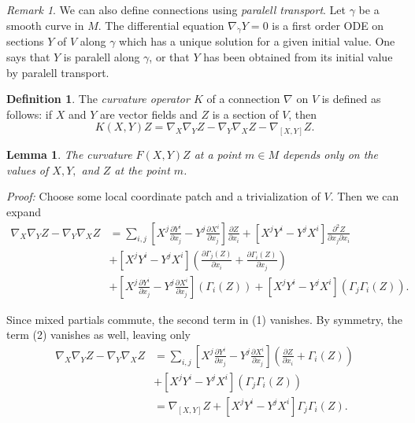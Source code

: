 \documentclass[12pt, reqno]{extarticle}
\theoremstyle{plain}
\newtheorem{lemma}{Lemma}[section]
\theoremstyle{definition}
\newtheorem{definition}{Definition}[section]
\theoremstyle{remark}
\newtheorem{remark}{Remark}[section]
\begin{document}
\begin{remark}
    We can also define connections using \textit{paralell transport}. Let $\gamma$ be a 
    smooth curve in $M$. The differential equation $\nabla_{\dot{\gamma}}Y = 0$ is a first 
    order ODE on sections $Y$ of $V$ along $\gamma$ which has a unique solution for a 
    given initial value. One says that $Y$ is paralell along $\gamma$, or that 
    $Y$ has been obtained from its initial value by paralell transport. 
\end{remark}

\begin{definition}
    The \textit{curvature operator $K$} of a connection $\nabla$ on $V$ is defined as follows: 
    if $X$ and $Y$ are vector fields and $Z$ is a section of $V$, then 
    \[
        K(X,Y)Z = \nabla_X\nabla_Y Z - \nabla_Y \nabla_X Z - \nabla_{[X,Y]}Z.
    \]
\end{definition}

\begin{lemma}
    The curvature $F(X,Y)Z$ at a point $m \in M$ depends only on the values of $X, Y,$ and $Z$ at the point 
    $m$.
\end{lemma}

\textit{Proof:} Choose some local coordinate patch and a trivialization of $V$. Then we can expand
\begin{align}
    \nabla_X \nabla_Y Z - \nabla_Y \nabla_X Z & = 
    \sum_{i,j} \left[X^j \frac{\partial Y^i}{\partial x_j} 
    - Y^j \frac{\partial X^i}{\partial x_j}\right]\frac{\partial Z}{\partial x_i}
    + \left[ X^j Y^i - Y^j X^i\right] \frac{\partial^2 Z}{\partial x_j \partial x_i}\\
    & + \left[ X^j Y^i - Y^j X^i\right] \left(\frac{\partial \Gamma_j(Z)}{\partial x_i} 
    + \frac{\partial\Gamma_i(Z)}{\partial x_j}\right)\\
    & + \left[ X^j \frac{\partial Y^i}{\partial x_j} - Y^j \frac{\partial X^i}{\partial x_j}\right]\left(\Gamma_i(Z)\right)
    + \left[X^j Y^i - Y^j X^i\right]\left(\Gamma_j \Gamma_i(Z)\right).
\end{align}

Since mixed partials commute, the second term in (1) vanishes. By symmetry, the term (2) vanishes as well, leaving only
\begin{align*}
    \nabla_X \nabla_Y Z - \nabla_Y \nabla_X Z & = 
    \sum_{i,j} \left[X^j \frac{\partial Y^i}{\partial x_j} 
    - Y^j \frac{\partial X^i}{\partial x_j}\right]\left(\frac{\partial Z}{\partial x_i} + \Gamma_i(Z)\right)\\
    & + \left[X^j Y^i - Y^j X^i\right]\left(\Gamma_j \Gamma_i(Z)\right)\\
    & = \nabla_{[X,Y]}Z + \left[X^j Y^i - Y^j X^i\right]\Gamma_j\Gamma_i(Z).
\end{align*}
\end{document}
